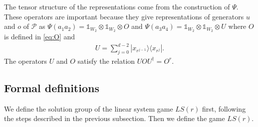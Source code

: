 \documentclass[11pt,letterpaper]{article}
\newcommand{\ketbra}[2]{|#1\rangle\langle#2|}
\newcommand{\x}{\otimes}
\newcommand{\ct}{^{\dagger}}
\newcommand{\C}{\mathbb{C}}
\newcommand{\calH}{\mathcal{H}}
\newcommand{\1}{\mathbb{1}}
\newcommand{\Pg}{\mathcal{P}}
\newcommand{\LS}{LS}
\theoremstyle{definition}
\begin{document}
The tensor structure of the representations come from the construction of $\Psi$.
These operators are important because they give representations of generators 
$u$ and $o$ of $\Pg$ as $\Psi(a_1a_2) = \1_{W_2} \x \1_{W_2} \x O$
and $\Psi(a_3a_4) = \1_{W_2} \x \1_{W_2} \x U$ where $O$ is defined in \cref{eq:O} and
\begin{align}
    \label{eq:u1u2}
    U = \sum_{j=0}^{d-2} \ketbra{x_{r^{j-1}}}{x_{r^j}}.
\end{align}
The operators $U$ and $O$ satisfy the relation $UOU\ct = O^r$.



\subsection{Formal definitions}
\label{sec:gamma_def}
We define the solution group of the linear system game $\LS(r)$ first, following the steps described in the previous subsection.
Then we define the game $\LS(r)$.
\end{document}
